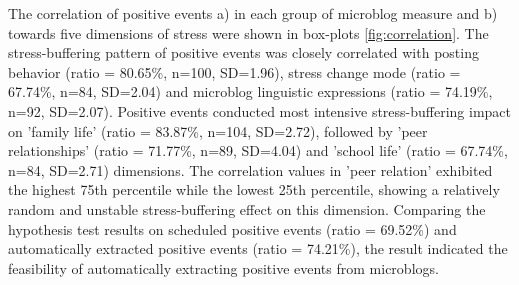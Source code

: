 The correlation of positive events a) in each group of microblog measure
and b) towards five dimensions of stress
were shown in box-plots \ref{fig:correlation}.
The stress-buffering pattern of positive events
was closely correlated with posting behavior (ratio = 80.65\%, n=100, SD=1.96),
stress change mode (ratio = 67.74\%, n=84, SD=2.04) and microblog linguistic expressions (ratio = 74.19\%, n=92, SD=2.07).
Positive events conducted most intensive stress-buffering impact on 'family life' (ratio = 83.87\%, n=104, SD=2.72),
followed by 'peer relationships' (ratio = 71.77\%, n=89, SD=4.04) and 'school life' (ratio = 67.74\%, n=84, SD=2.71) dimensions.
The correlation values in 'peer relation'
exhibited the highest 75th percentile while the lowest 25th percentile,
showing a relatively random and unstable stress-buffering effect on this dimension.
Comparing the hypothesis test results on scheduled positive events (ratio = 69.52\%)
and automatically extracted positive events (ratio = 74.21\%),
the result indicated the feasibility of automatically extracting positive events from microblogs.


\begin{table}
\begin{center}
\caption{\small{Quantify the impact of scheduled positive school events using KTS (the KNN-based two sample method adopted in this research) and baseline method.}}
\label{tab:schedule}
\end{center}
\end{table}

